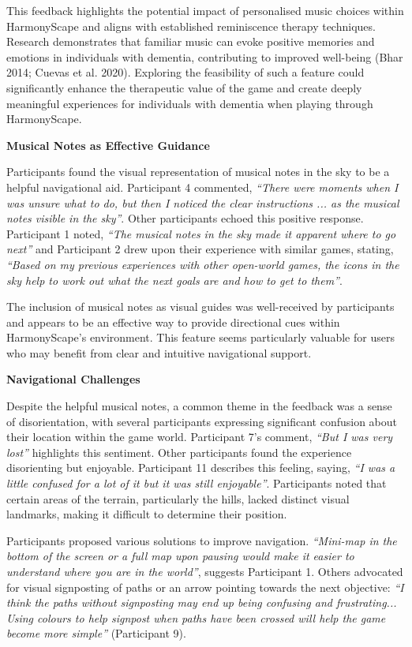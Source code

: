 \documentclass{l4proj}
\begin{document}
This feedback highlights the potential impact of personalised music choices within HarmonyScape and aligns with established reminiscence therapy techniques. Research demonstrates that familiar music can evoke positive memories and emotions in individuals with dementia, contributing to improved well-being (Bhar 2014; Cuevas et al. 2020). Exploring the feasibility of such a feature could significantly enhance the therapeutic value of the game and create deeply meaningful experiences for individuals with dementia when playing through HarmonyScape.
\newline

\textbf{Musical Notes as Effective Guidance}

Participants found the visual representation of musical notes in the sky to be a helpful navigational aid. Participant 4 commented, \emph{“There were moments when I was unsure what to do, but then I noticed the clear instructions ... as the musical notes visible in the sky”}. Other participants echoed this positive response. Participant 1 noted, \emph{“The musical notes in the sky made it apparent where to go next”} and Participant 2 drew upon their experience with similar games, stating, \emph{“Based on my previous experiences with other open-world games, the icons in the sky help to work out what the next goals are and how to get to them”}.

The inclusion of musical notes as visual guides was well-received by participants and appears to be an effective way to provide directional cues within HarmonyScape's environment. This feature seems particularly valuable for users who may benefit from clear and intuitive navigational support.
\newline

\textbf{Navigational Challenges}

Despite the helpful musical notes, a common theme in the feedback was a sense of disorientation, with several participants expressing significant confusion about their location within the game world. Participant 7's comment, \emph{“But I was very lost”} highlights this sentiment. Other participants found the experience disorienting but enjoyable. Participant 11 describes this feeling, saying, \emph{“I was a little confused for a lot of it but it was still enjoyable”}. Participants noted that certain areas of the terrain, particularly the hills, lacked distinct visual landmarks, making it difficult to determine their position. 

Participants proposed various solutions to improve navigation. \emph{“Mini-map in the bottom of the screen or a full map upon pausing would make it easier to understand where you are in the world”}, suggests Participant 1. Others advocated for visual signposting of paths or an arrow pointing towards the next objective: \emph{“I think the paths without signposting may end up being confusing and frustrating... Using colours to help signpost when paths have been crossed will help the game become more simple”} (Participant 9).
\end{document}
